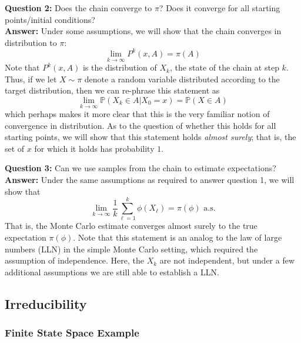 \documentclass[12pt]{article}
\newcommand{\Prob}{\mathbb{P}}
\begin{document}
\bigskip
\noindent
\textbf{Question 2:} Does the chain converge to $\pi$? Does it converge for all starting points/initial conditions? \\
\textbf{Answer:} Under some assumptions, we will show that the chain converges in distribution to $\pi$: 
\[\lim_{k \to \infty} P^k(x, A) = \pi(A)\]
Note that $P^{k}(x, A)$ is the distribution of $X_k$, the state of the chain at step $k$. Thus, if we let $X \sim \pi$ denote a random variable distributed according to the target distribution, then we can re-phrase this
statement as 
\[\lim_{k \to \infty} \Prob(X_k \in A|X_0 = x) = \Prob(X \in A)\]
which perhaps makes it more clear that this is the very familiar notion of convergence in distribution. 
As to the question of whether this holds for all starting points, we will show that this statement holds \textit{almost surely}; that is, the set of $x$ for which it holds has probability $1$.

\bigskip
\noindent
\textbf{Question 3:} Can we use samples from the chain to estimate expectations? \\
\textbf{Answer:} Under the same assumptions as required to answer question 1, we will show that 
\[\lim_{k \to \infty} \frac{1}{k} \sum_{\ell = 1}^{k} \phi(X_\ell) = \pi(\phi) \text{ a.s.}\]
That is, the Monte Carlo estimate converges almost surely to the true expectation $\pi(\phi)$. Note that this statement is an analog to the law of large numbers (LLN) in the simple Monte Carlo setting, which required the 
assumption of independence. Here, the $X_k$ are not independent, but under a few additional assumptions we are still able to establish a LLN. 

\subsection{Irreducibility}

\subsubsection{Finite State Space Example}
\end{document}

